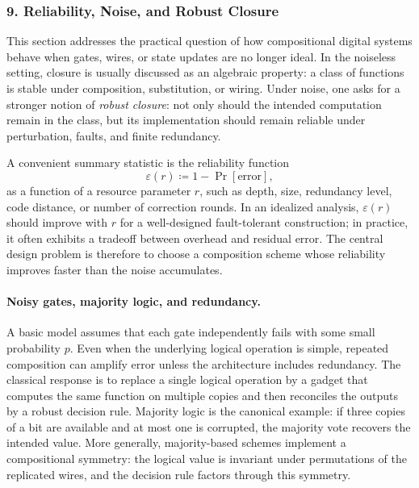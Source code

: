 \documentclass[11pt]{article}
\begin{document}

\subsubsection{9. Reliability, Noise, and Robust Closure}


This section addresses the practical question of how compositional digital systems behave when gates, wires, or state updates are no longer ideal. In the noiseless setting, closure is usually discussed as an algebraic property: a class of functions is stable under composition, substitution, or wiring. Under noise, one asks for a stronger notion of \emph{robust closure}: not only should the intended computation remain in the class, but its implementation should remain reliable under perturbation, faults, and finite redundancy.

A convenient summary statistic is the reliability function
\[
\varepsilon(r) \coloneqq 1 - \Pr[\text{error}],
\]
as a function of a resource parameter \(r\), such as depth, size, redundancy level, code distance, or number of correction rounds. In an idealized analysis, \(\varepsilon(r)\) should improve with \(r\) for a well-designed fault-tolerant construction; in practice, it often exhibits a tradeoff between overhead and residual error. The central design problem is therefore to choose a composition scheme whose reliability improves faster than the noise accumulates.

\paragraph{Noisy gates, majority logic, and redundancy.}
A basic model assumes that each gate independently fails with some small probability \(p\). Even when the underlying logical operation is simple, repeated composition can amplify error unless the architecture includes redundancy. The classical response is to replace a single logical operation by a gadget that computes the same function on multiple copies and then reconciles the outputs by a robust decision rule. Majority logic is the canonical example: if three copies of a bit are available and at most one is corrupted, the majority vote recovers the intended value. More generally, majority-based schemes implement a compositional symmetry: the logical value is invariant under permutations of the replicated wires, and the decision rule factors through this symmetry.
\end{document}
